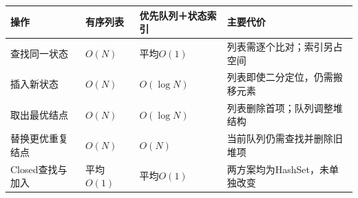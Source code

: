 \begin{tabular}{p{64bp}p{86bp}p{105bp}p{118bp}}
\toprule
\textbf{操作} & \textbf{有序列表} & \textbf{优先队列＋状态索引} & \textbf{主要代价} \\
\midrule
查找同一状态 & $O(N)$ & 平均$O(1)$ & 列表需逐个比对；索引另占空间 \\
插入新状态 & $O(N)$ & $O(\log N)$ & 列表即使二分定位，仍需搬移元素 \\
取出最优结点 & $O(N)$ & $O(\log N)$ & 列表删除首项；队列调整堆结构 \\
替换更优重复结点 & $O(N)$ & $O(N)$ & 当前队列仍需查找并删除旧堆项 \\
Closed查找与加入 & 平均$O(1)$ & 平均$O(1)$ & 两方案均为HashSet，未单独改变 \\
\bottomrule
\end{tabular}
